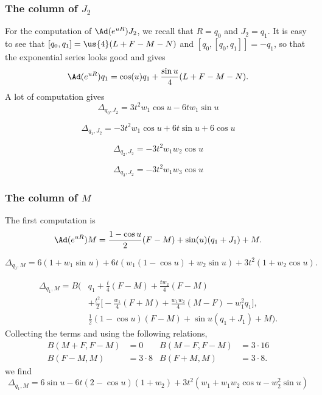 \subsubsection{The column of \texorpdfstring{$J_2$}{J2}}

For the computation of $\Ad(e^{uR})J_2$, we recall that $R=q_0$ and $J_2=q_1$. It is easy to see that $[q_0,q_1]=\us{4}(L+F-M-N)$ and $[q_0,[q_0,q_1]]=-q_1$, so that the exponential series looks good and gives
\[
	\Ad(e^{uR})q_1= \cos(u)q_1+\frac{\sin u}{4}(L+F-M-N).
\]
A lot of computation gives
\begin{equation}
	\boxed{\Delta_{q_0,J_2}=3t^2w_1\cos u-6tw_1\sin u}
\end{equation}



\begin{equation}
	\boxed{\Delta_{q_1,J_2}=-3t^2w_1\cos u+6t\sin u+6\cos u}
\end{equation}



\begin{equation}
	\boxed{\Delta_{q_2,J_2}=-3t^2w_1w_2\cos u}
\end{equation}


\begin{equation}
	\boxed{\Delta_{q_3,J_2}=-3t^2w_1w_3\cos u}
\end{equation}


\subsubsection{The column of \texorpdfstring{$M$}{M}}

The first computation is
\[
	\Ad(e^{uR})M=\frac{1-\cos u}{2}(F-M)+\sin(u)(q_1+J_1)+M.
\]

\begin{equation}
	\boxed{\Delta_{q_0,M}=6(1+w_1\sin u)+6t(w_1(1-\cos u)+w_2\sin u)+3t^2(1+w_2\cos u).
	}
\end{equation}

\begin{align}
	\Delta_{q_1,M}=B
	\Big( &
	q_1+\frac{t}{4}(F-M)+\frac{tw_2}{4}(F-M)             \\
	      & +\frac{t^2}{2}
	\big[
		-\frac{w_1}{4}(F+M)+\frac{w_1w_2}{4}(M-F)-w_1^2q_1
	\big],                                               \\
	      & \frac{1}{2}(1-\cos u)(F-M)+\sin u(q_1+J_1)+M
	\Big).
\end{align}
Collecting the terms and using the following relations,
\begin{subequations}
	\begin{align}
		B(M+F,F-M) & =0        & B(M-F,F-M) & =3\cdot 16 \\
		B(F-M,M)   & =3\cdot 8 & B(F+M,M)   & =3\cdot 8.
	\end{align}
\end{subequations}
we find
\begin{equation}
	\boxed{\Delta_{q_1,M}=6\sin u-6t(2-\cos u)(1+w_2)+3t^2(w_1+w_1w_2\cos u-w_2^2\sin u)}
\end{equation}

